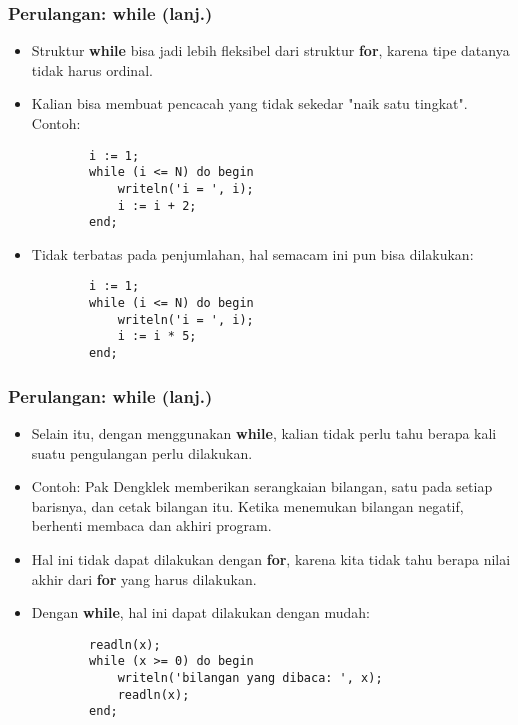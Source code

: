 \documentclass{beamer}
\begin{document}
\begin{frame}[fragile]
\frametitle{Perulangan: while (lanj.)} 
\begin{itemize}
	\item Struktur \textbf{while} bisa jadi lebih fleksibel dari struktur \textbf{for}, karena tipe datanya tidak harus ordinal.
	\item Kalian bisa membuat pencacah yang tidak sekedar "naik satu tingkat". Contoh:
	\begin{lstlisting}
		i := 1;
		while (i <= N) do begin
		    writeln('i = ', i);
		    i := i + 2;
		end;
	\end{lstlisting}
	
	\item Tidak terbatas pada penjumlahan, hal semacam ini pun bisa dilakukan:
	\begin{lstlisting}
		i := 1;
		while (i <= N) do begin
		    writeln('i = ', i);
		    i := i * 5;
		end;
	\end{lstlisting}
\end{itemize}
\end{frame}

\begin{frame}[fragile]
\frametitle{Perulangan: while (lanj.)} 
\begin{itemize}
	\item Selain itu, dengan menggunakan \textbf{while}, kalian tidak perlu tahu berapa kali suatu pengulangan perlu dilakukan.
	\item Contoh: Pak Dengklek memberikan serangkaian bilangan, satu pada setiap barisnya, dan cetak bilangan itu. Ketika menemukan bilangan negatif, berhenti membaca dan akhiri program.
	\item Hal ini tidak dapat dilakukan dengan \textbf{for}, karena kita tidak tahu berapa nilai akhir dari \textbf{for} yang harus dilakukan.
	\item Dengan \textbf{while}, hal ini dapat dilakukan dengan mudah:
	\begin{lstlisting}
		readln(x);
		while (x >= 0) do begin
		    writeln('bilangan yang dibaca: ', x);
		    readln(x);
		end;
	\end{lstlisting}
\end{itemize}
\end{frame}
\end{document}
